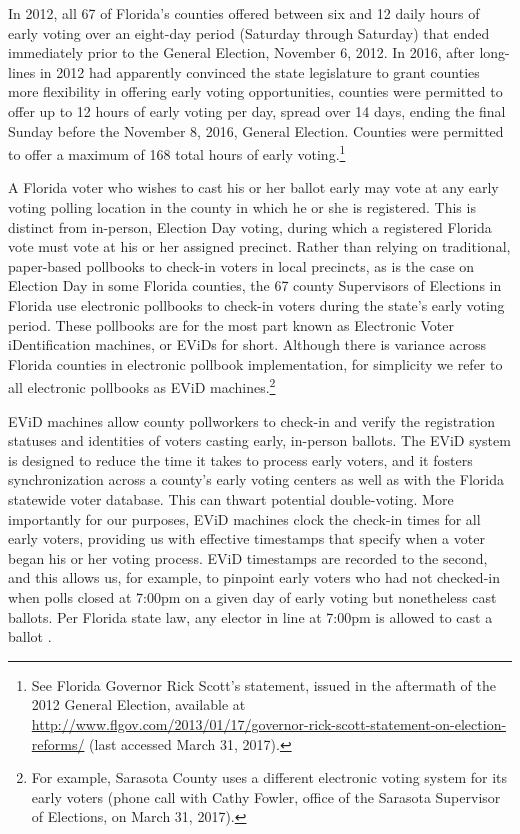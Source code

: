 \documentclass[12pt,titlepage]{article}
\begin{document}
In 2012, all 67 of Florida's counties offered between six and 12 daily
hours of early voting over an eight-day period (Saturday through
Saturday) that ended immediately prior to the General Election,
November 6, 2012.  In 2016, after long-lines in 2012 had apparently
convinced the state legislature to grant counties more flexibility in
offering early voting opportunities, counties were permitted to offer
up to 12 hours of early voting per day, spread over 14 days, ending
the final Sunday before the November 8, 2016, General Election.
Counties were permitted to offer a maximum of 168 total hours of early
voting.\footnote{See Florida Governor Rick Scott's statement, issued
  in the aftermath of the 2012 General Election, available at
  \url{http://www.flgov.com/2013/01/17/governor-rick-scott-statement-on-election-reforms/}
  (last accessed March 31, 2017).}

A Florida voter who wishes to cast his or her ballot early may vote at
any early voting polling location in the county in which he or she is
registered.  This is distinct from in-person, Election Day voting,
during which a registered Florida vote must vote at his or her
assigned precinct.  Rather than relying on traditional, paper-based
pollbooks to check-in voters in local precincts, as is the case on
Election Day in some Florida counties, the 67 county Supervisors of
Elections in Florida use electronic pollbooks to check-in voters
during the state's early voting period.  These pollbooks are for the
most part known as Electronic Voter iDentification machines, or EViDs
for short.  Although there is variance across Florida counties in
electronic pollbook implementation, for simplicity we refer to all
electronic pollbooks as EViD machines.\footnote{For example, Sarasota
  County uses a different electronic voting system for its early
  voters (phone call with Cathy Fowler, office of the Sarasota
  Supervisor of Elections, on March 31, 2017).}


EViD machines allow county pollworkers to check-in and verify the
registration statuses and identities of voters casting early,
in-person ballots. The EViD system is designed to reduce the time it
takes to process early voters, and it fosters synchronization across a
county's early voting centers as well as with the Florida statewide
voter database.  This can thwart potential double-voting.  More
importantly for our purposes, EViD machines clock the check-in times
for all early voters, providing us with effective timestamps that
specify when a voter began his or her voting process. EViD timestamps
are recorded to the second, and this allows us, for example, to
pinpoint early voters who had not checked-in when polls closed at
7:00pm on a given day of early voting but nonetheless cast ballots.
Per Florida state law, any elector in line at 7:00pm is allowed to
cast a ballot \citet{FLStatutes:7pm}.
\end{document}
